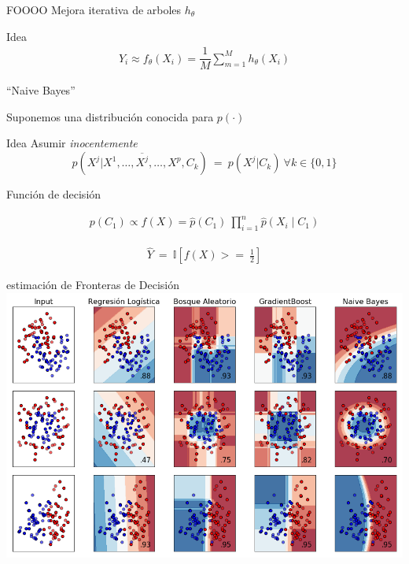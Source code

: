 \documentclass[xcolor=x11names]{beamer}
\begin{document}
\begin{frame}{FOOOO}
	Mejora iterativa de arboles $h_{\theta}$

	\begin{block}{Idea} 
		\begin{align*}
			Y_i \approx f_{\theta}(X_i) = \dfrac{1}{M}\sum_{m=1}^M h_{\theta}(X_i) 
		\end{align*}

	\end{block}

\end{frame}




\begin{frame}{``Naive Bayes''}

Suponemos una distribución conocida para $p(\cdot)$
	\begin{block}{Idea}
		Asumir \textit{inocentemente}
		$$p(X^j |X^1,\ldots,\overline{X^j},\ldots,X^p, C_k) \ = \ p(X^j | C_k) \ \forall k \in \{0,1\}$$
	\end{block}

	\begin{block}{Función de decisión }

		\begin{align*}
			p(C_1) \propto f(X) = \hat{p}(C_{1}) \  \prod_{i=1}^{n} \hat{p}(X_{i}\mid C_{1})
		\end{align*}

		\begin{align*}
			\hat{Y} \ = \ \mathbb{I}\left[  f(X)  >= \ \frac{1}{2} \right]
		\end{align*}

	\end{block}
\end{frame}


\begin{frame}{estimación de Fronteras de Decisión}
		\includegraphics[width = 0.9 \paperwidth, height = 0.7 \paperheight, 
										trim = 0.2 0.2 0.2 0.2cm, left, clip = true]{slides/plot_classifier_comparison.png}
\end{frame}
\end{document}
